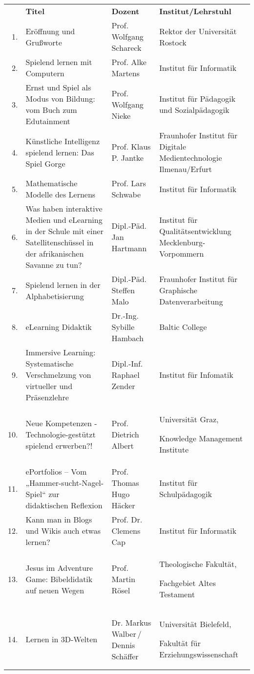 \begin{longtable}{rXp{5cm}p{4cm}}
   & \centering\textbf{Titel} & \centering\textbf{Dozent} &
  \textbf{Institut/Lehrstuhl}\\
  1. & Eröffnung und Grußworte & Prof. Wolfgang Schareck & Rektor der
  Universität Rostock\\

  2. & Spielend lernen mit Computern & Prof. Alke Martens & Institut für
  Informatik\\

  3. & Ernst und Spiel als Modus von Bildung: vom Buch zum Edutainment & Prof.
  Wolfgang Nieke & Institut für Pädagogik und Sozialpädagogik\\

  4. & Künstliche Intelligenz spielend lernen: Das Spiel Gorge & Prof. Klaus P.
  Jantke & Fraunhofer Institut für Digitale Medientechnologie Ilmenau/Erfurt\\

  5. & Mathematische Modelle des Lernens & Prof. Lars Schwabe & Institut für
  Informatik\\

  6. & Was haben interaktive Medien und eLearning in der Schule mit einer
  Satellitenschüssel in der afrikanischen Savanne zu tun? & Dipl.-Päd. Jan
  Hartmann & Institut für Qualitätsentwicklung Mecklenburg-Vorpommern\\

  7. & Spielend lernen in der Alphabetisierung & Dipl.-Päd. Steffen Malo &
  Fraunhofer Institut für Graphische Datenverarbeitung\\

  8. & eLearning Didaktik & Dr.-Ing. Sybille Hambach & Baltic College\\

  9. & Immersive Learning: Systematische Verschmelzung von virtueller und
  Präsenzlehre & Dipl.-Inf. Raphael Zender & Institut für Infomatik\\

  10. & Neue Kompetenzen - Technologie-gestützt spielend erwerben?! &
  Prof. Dietrich Albert & Universität Graz,

  Knowledge Management Institute\\

  11. & ePortfolios – Vom „Hammer-sucht-Nagel-Spiel“ zur didaktischen Reflexion
      & Prof. Thomas Hugo Häcker & Institut für Schulpädagogik\\

  12. & Kann man in Blogs und Wikis auch etwas lernen? & Prof. Dr. Clemens Cap &
  Institut für Informatik\\

  13. & Jesus im Adventure Game: Bibeldidatik auf neuen Wegen & Prof. Martin
  Rösel & Theologische Fakultät,

  Fachgebiet Altes Testament\\

  14. & Lernen in 3D-Welten & Dr. Markus Walber\,/\,Dennis Schäffer &
  Universität Bielefeld,

  Fakultät für Erziehungswissenschaft\\
\end{longtable}
